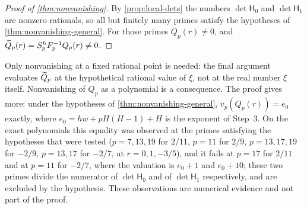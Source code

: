 \begin{proof}[Proof of \cref{thm:nonvanishing}]
By \cref{prop:local-dets} the numbers $\det\mathsf H_0$ and $\det\mathsf H_1$ are nonzero rationals, so all but finitely many primes satisfy the hypotheses of \cref{thm:nonvanishing-general}. For those primes $Q_p(r)\ne0$, and $\widetilde{Q}_p(r)=S_p^h F_p^{-1}Q_p(r)\ne0$.
\end{proof}

\begin{remark}
Only nonvanishing at a fixed rational point is needed: the final argument evaluates $\widetilde{Q}_p$ at the hypothetical rational value of $\xi$, not at the real number $\xi$ itself. Nonvanishing of $Q_p$ as a polynomial is a consequence. The proof gives more: under the hypotheses of \cref{thm:nonvanishing-general}, $v_p(Q_p(r))=e_0$ exactly, where $e_0=hw+pH(H-1)+H$ is the exponent of Step~3. On the exact polynomials this equality was observed at the primes satisfying the hypotheses that were tested ($p=7,13,19$ for $2/11$, $p=11$ for $2/9$, $p=13,17,19$ for $-2/9$, $p=13,17$ for $-2/7$, at $r=0,1,-3/5$), and it fails at $p=17$ for $2/11$ and at $p=11$ for $-2/7$, where the valuation is $e_0+1$ and $e_0+10$; these two primes divide the numerator of $\det\mathsf H_0$ and of $\det\mathsf H_1$ respectively, and are excluded by the hypothesis. These observations are numerical evidence and not part of the proof.
\end{remark}
